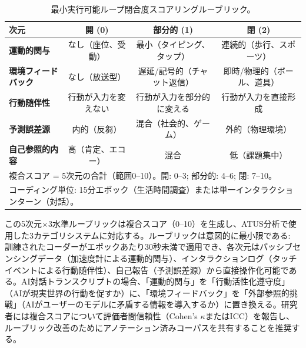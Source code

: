 \documentclass[a4paper,11pt,titlepage]{article}
\begin{document}
\begin{table}[htbp]
\centering
\caption{最小実行可能ループ閉合度スコアリングルーブリック。}
\label{tab:lc-rubric}
\small
\begin{tabular}{p{3.0cm}ccc}
\toprule
次元 & \textbf{開 (0)} & \textbf{部分的 (1)} & \textbf{閉 (2)} \\
\midrule
\textbf{運動的関与} & なし（座位、受動） & 最小（タイピング、タップ） & 連続的（歩行、スポーツ） \\
\textbf{環境フィードバック} & なし（放送型） & 遅延/記号的（チャット返信） & 即時/物理的（ボール、道具） \\
\textbf{行動随伴性} & 行動が入力を変えない & 行動が入力を部分的に変える & 行動が入力を直接形成 \\
\textbf{予測誤差源} & 内的（反芻） & 混合（社会的、ゲーム） & 外的（物理環境） \\
\textbf{自己参照的内容} & 高（肯定、エコー） & 混合 & 低（課題集中） \\
\bottomrule
\multicolumn{4}{l}{\scriptsize 複合スコア = 5次元の合計（範囲0--10）。開: 0--3; 部分的: 4--6; 閉: 7--10。} \\
\multicolumn{4}{l}{\scriptsize コーディング単位: 15分エポック（生活時間調査）または単一インタラクションターン（対話）。}
\end{tabular}
\end{table}

この5次元$\times$3水準ルーブリックは複合スコア（0--10）を生成し、ATUS分析で使用した3カテゴリシステムに対応する。ルーブリックは意図的に最小限である: 訓練されたコーダーがエポックあたり30秒未満で適用でき、各次元はパッシブセンシングデータ（加速度計による運動的関与）、インタラクションログ（タッチイベントによる行動随伴性）、自己報告（予測誤差源）から直接操作化可能である。AI対話トランスクリプトの場合、「運動的関与」を「行動活性化遵守度」（AIが現実世界の行動を促すか）に、「環境フィードバック」を「外部参照的挑戦」（AIがユーザーのモデルに矛盾する情報を導入するか）に置き換える。研究者には複合スコアについて評価者間信頼性（Cohen's $\kappa$またはICC）を報告し、ルーブリック改善のためにアノテーション済みコーパスを共有することを推奨する。
\end{document}
